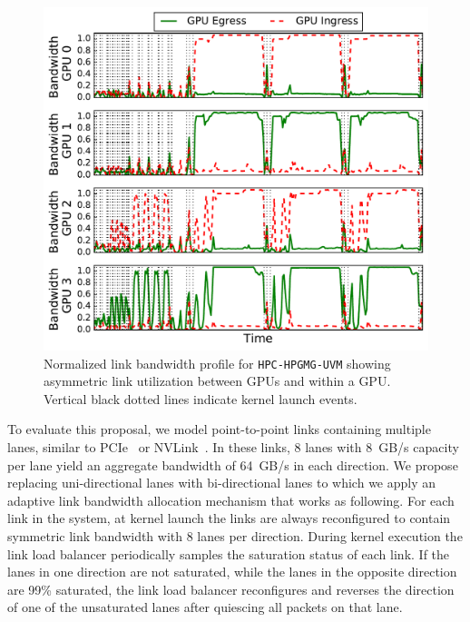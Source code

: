 \begin{figure}[t]
	\centering
	
	\includegraphics[width=1.0\columnwidth]{figures/bw_profile_HPGMG_UVM_base.pdf}
	\caption{Normalized link bandwidth profile for \texttt{HPC-HPGMG-UVM} 
		showing asymmetric link utilization between GPUs and within a GPU. Vertical black 
		dotted lines indicate kernel launch events.}
	\label{fig:link-motivation}
	\vspace{-.1in}
\end{figure}

To evaluate this proposal, we model point-to-point links containing multiple 
lanes, similar to PCIe~\cite{PCIe3.1a} or NVLink~\cite{pascal-tesla-wp}. In these links, 8 
lanes with \SI{8}{GB/s} capacity per lane yield an aggregate bandwidth of \SI{64}{GB/s} in 
each direction. We propose replacing uni-directional lanes with bi-directional 
lanes to which we apply an adaptive link bandwidth allocation mechanism that 
works as following. For each link in the system, at kernel launch the links are 
always reconfigured to contain symmetric link bandwidth with 8 lanes per 
direction. During kernel execution the link load balancer periodically samples 
the saturation status of each link. If the lanes in one direction are not 
saturated, while the lanes in the opposite direction are 99\% saturated, the 
link load balancer reconfigures and reverses the direction of one of the 
unsaturated lanes after quiescing all packets on that lane. 

